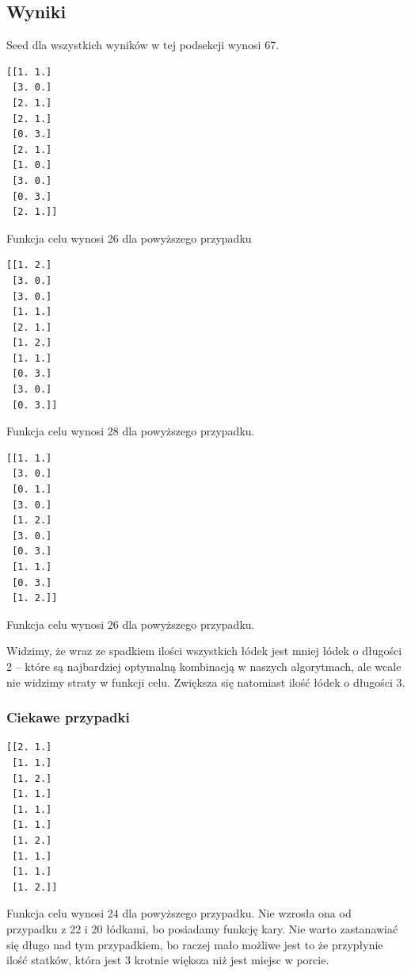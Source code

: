 \documentclass{article}
\begin{document}
\subsection{Wyniki}

Seed dla wszystkich wyników w tej podsekcji wynosi 67.

\begin{lstlisting}[caption={Wyniki dla N\_rzedow = 10, N\_slotow = 2 i 20 łódek}]
[[1. 1.]
 [3. 0.]
 [2. 1.]
 [2. 1.]
 [0. 3.]
 [2. 1.]
 [1. 0.]
 [3. 0.]
 [0. 3.]
 [2. 1.]]
\end{lstlisting}

Funkcja celu wynosi 26 dla powyższego przypadku 

\begin{lstlisting}[caption={Wyniki dla N\_rzedow = 10, N\_slotow = 2 i 18 łódek}]
[[1. 2.]
 [3. 0.]
 [3. 0.]
 [1. 1.]
 [2. 1.]
 [1. 2.]
 [1. 1.]
 [0. 3.]
 [3. 0.]
 [0. 3.]]
\end{lstlisting}

Funkcja celu wynosi 28 dla powyższego przypadku.

\begin{lstlisting}[caption={Wyniki dla N\_rzedow = 10, N\_slotow = 2 i 16 łódek}]
[[1. 1.]
 [3. 0.]
 [0. 1.]
 [3. 0.]
 [1. 2.]
 [3. 0.]
 [0. 3.]
 [1. 1.]
 [0. 3.]
 [1. 2.]]
\end{lstlisting}

Funkcja celu wynosi 26 dla powyższego przypadku.

Widzimy, że wraz ze spadkiem ilości wszystkich łódek jest mniej łódek o długości 2 -- które są najbardziej optymalną kombinacją w naszych algorytmach, ale wcale nie widzimy straty w funkcji celu. Zwiększa się natomiast ilość łódek o długości 3.

\subsubsection{Ciekawe przypadki}

\begin{lstlisting}[caption={Wyniki dla N\_rzedow = 10, N\_slotow = 2 i 67 łódek}]
[[2. 1.]
 [1. 1.]
 [1. 2.]
 [1. 1.]
 [1. 1.]
 [1. 1.]
 [1. 2.]
 [1. 1.]
 [1. 1.]
 [1. 2.]]
\end{lstlisting}

Funkcja celu wynosi 24 dla powyższego przypadku. Nie wzrosła ona od przypadku z 22 i 20 łódkami, bo posiadamy funkcję kary. Nie warto zastanawiać się długo nad tym przypadkiem, bo raczej mało możliwe jest to że przypłynie ilość statków, która jest 3 krotnie większa niż jest miejsc w porcie.
\end{document}
